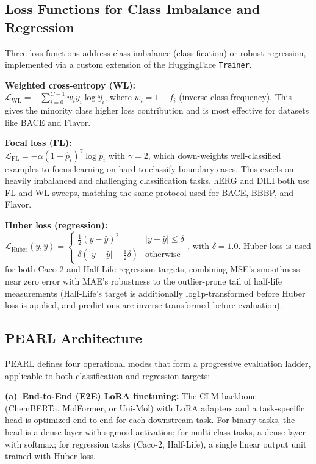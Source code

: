 \documentclass[final,1p,times]{elsarticle}
\begin{document}
\subsection{Loss Functions for Class Imbalance and Regression} \label{loss_functions}
Three loss functions address class imbalance (classification) or robust regression, implemented via a custom extension of the HuggingFace \texttt{Trainer}.

\noindent \textbf{Weighted cross-entropy (WL):}\\
$\mathcal{L}_{\text{WL}} = -\sum_{i=0}^{C-1} w_i y_i \log\hat{y}_i$, where $w_i = 1 - f_i$ (inverse class frequency). This gives the minority class higher loss contribution and is most effective for datasets like BACE and Flavor.

\noindent\textbf{Focal loss (FL):}\\
$\mathcal{L}_{\text{FL}} = -\alpha (1 - \hat{p}_i)^\gamma \log\hat{p}_i$ with $\gamma = 2$, which down-weights well-classified examples to focus learning on hard-to-classify boundary cases. This excels on heavily imbalanced and challenging classification tasks. hERG and DILI both use FL and WL sweeps, matching the same protocol used for BACE, BBBP, and Flavor.

\noindent\textbf{Huber loss (regression):}\\
$\mathcal{L}_{\text{Huber}}(y, \hat y) = \begin{cases}\tfrac{1}{2}(y-\hat y)^2 & |y - \hat y| \le \delta \\ \delta(|y-\hat y| - \tfrac12 \delta) & \text{otherwise}\end{cases}$, with $\delta = 1.0$. Huber loss is used for both Caco-2 and Half-Life regression targets, combining MSE's smoothness near zero error with MAE's robustness to the outlier-prone tail of half-life measurements (Half-Life's target is additionally log1p-transformed before Huber loss is applied, and predictions are inverse-transformed before evaluation).

\subsection{PEARL Architecture} \label{sec:pearl_arch}
PEARL defines four operational modes that form a progressive evaluation ladder, applicable to both classification and regression targets:

\textbf{(a)~End-to-End (E2E) LoRA finetuning:}
The CLM backbone (ChemBERTa, MolFormer, or Uni-Mol) with LoRA adapters and a task-specific head is optimized end-to-end for each downstream task. For binary tasks, the head is a dense layer with sigmoid activation; for multi-class tasks, a dense layer with softmax; for regression tasks (Caco-2, Half-Life), a single linear output unit trained with Huber loss.
\end{document}
